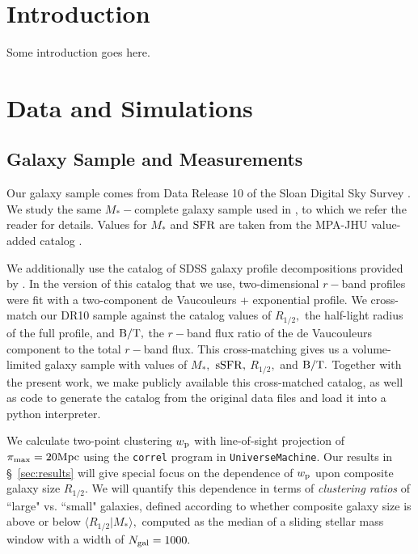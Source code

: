 \documentclass[usenatbib,usegraphicx,letterpaper]{mn2e}
\newcommand{\rhalf}{R_{1/2}}
\newcommand{\bt}{{\rm B/T}}
\newcommand{\mstar}{M_{\ast}}
\newcommand{\ssfr}{{\rm sSFR}}
\newcommand{\sfr}{{\rm SFR}}
\newcommand{\wproj}{w_{\rm p}}
\newcommand{\mpc}{{\rm Mpc}}
\begin{document}
\section{Introduction}
\label{sec:intro}
Some introduction goes here.

\section{Data and Simulations}
\label{sec:data}

\subsection{Galaxy Sample and Measurements}
\label{subsec:galaxydata}


Our galaxy sample comes from Data Release 10 of the Sloan Digital Sky Survey \citep[SDSS][]{ahn_etal14}. We study the same $\mstar-$complete galaxy sample used in \citet{behroozi_etal15}, to which we refer the reader for details. Values for $\mstar$ and $\sfr$ are taken from the MPA-JHU value-added catalog \citep{kauffmann_etal03,brinchmann_etal04}. 

We additionally use the catalog of SDSS galaxy profile decompositions provided by \citet{meert_etal15}. In the version of this catalog that we use, two-dimensional $r-$band profiles were fit with a two-component de Vaucouleurs + exponential profile. We cross-match our DR10 sample against the \citet{meert_etal15} catalog values of $\rhalf,$ the half-light radius of the full profile, and $\bt,$ the $r-$band flux ratio of the de Vaucouleurs component to the total $r-$band flux. This cross-matching gives us a volume-limited galaxy sample with values of $\mstar,$ $\ssfr,$ $\rhalf,$ and $\bt.$ Together with the present work, we make publicly available this cross-matched catalog, as well as code to generate the catalog from the original data files and load it into a python interpreter. 

We calculate two-point clustering $\wproj$ with line-of-sight projection of $\pi_{\rm max}=20\mpc$ using the {\tt correl} program in {\tt UniverseMachine}. Our results in \S~\ref{sec:results} will give special focus on the dependence of $\wproj$ upon composite galaxy size $\rhalf.$ We will quantify this dependence in terms of {\em clustering ratios} of ``large" vs. ``small" galaxies, defined according to whether composite galaxy size is above or below $\langle\rhalf\vert\mstar\rangle,$ computed as the median of a sliding stellar mass window with a width of $N_{\rm gal}=1000.$ 
\end{document}
